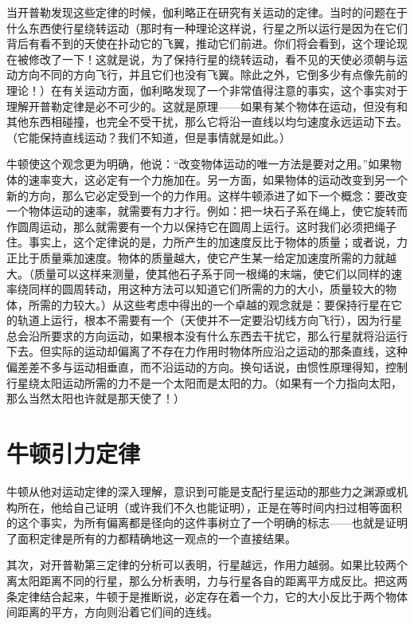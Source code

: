 当开普勒发现这些定律的时候，伽利略正在研究有关运动的定律。当时的问题在于什么东西使行星绕转运动（那时有一种理论这样说，行星之所以运行是因为在它们背后有看不到的天使在扑动它的飞翼，推动它们前进。你们将会看到，这个理论现在被修改了一下！这就是说，为了保持行星的绕转运动，看不见的天使必须朝与运动方向不同的方向飞行，并且它们也没有飞翼。除此之外，它倒多少有点像先前的理论！）在有关运动方面，伽利略发现了一个非常值得注意的事实，这个事实对于理解开普勒定律是必不可少的。这就是原理——如果有某个物体在运动，但没有和其他东西相碰撞，也完全不受干扰，那么它将沿一直线以均匀速度永远运动下去。（它能保持直线运动？我们不知道，但是事情就是如此。）

牛顿使这个观念更为明确，他说：“改变物体运动的唯一方法是要对之用。”如果物体的速率变大，这必定有一个力施加在。另一方面，如果物体的运动改变到另一个新的方向，那么它必定受到一个的力作用。这样牛顿添进了如下一个概念：要改变一个物体运动的速率，就需要有力才行。例如：把一块石子系在绳上，使它旋转而作圆周运动，那么就需要有一个力以保持它在圆周上运行。这时我们必须把绳子住。事实上，这个定律说的是，力所产生的加速度反比于物体的质量；或者说，力正比于质量乘加速度。物体的质量越大，使它产生某一给定加速度所需的力就越大。（质量可以这样来测量，使其他石子系于同一根绳的末端，使它们以同样的速率绕同样的圆周转动，用这种方法可以知道它们所需的力的大小，质量较大的物体，所需的力较大。）从这些考虑中得出的一个卓越的观念就是：要保持行星在它的轨道上运行，根本不需要有一个（天使并不一定要沿切线方向飞行），因为行星总会沿所要求的方向运动，如果根本没有什么东西去干扰它，那么行星就将沿运行下去。但实际的运动却偏离了不存在力作用时物体所应沿之运动的那条直线，这种偏差差不多与运动相垂直，而不沿运动的方向。换句话说，由惯性原理得知，控制行星绕太阳运动所需的力不是一个太阳而是太阳的力。（如果有一个力指向太阳，那么当然太阳也许就是那天使了！）


\section{牛顿引力定律}

牛顿从他对运动定律的深入理解，意识到可能是支配行星运动的那些力之渊源或机构所在，他给自己证明（或许我们不久也能证明），正是在等时间内扫过相等面积的这个事实，为所有偏离都是径向的这件事树立了一个明确的标志——也就是证明了面积定律是所有的力都精确地这一观点的一个直接结果。

其次，对开普勒第三定律的分析可以表明，行星越远，作用力越弱。如果比较两个离太阳距离不同的行星，那么分析表明，力与行星各自的距离平方成反比。把这两条定律结合起来，牛顿于是推断说，必定存在着一个力，它的大小反比于两个物体间距离的平方，方向则沿着它们间的连线。

